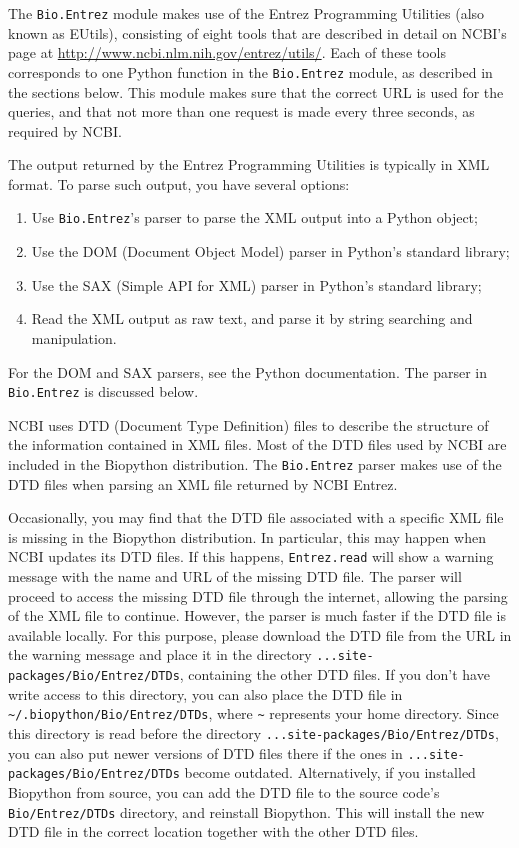 \documentclass{report}
\begin{document}
The \verb+Bio.Entrez+ module makes use of the Entrez Programming Utilities (also known as EUtils), consisting of eight tools that are described in detail on NCBI's page at \url{http://www.ncbi.nlm.nih.gov/entrez/utils/}.
Each of these tools corresponds to one Python function in the \verb+Bio.Entrez+ module, as described in the sections below. This module makes sure that the correct URL is used for the queries, and that not more than one request is made every three seconds, as required by NCBI.

The output returned by the Entrez Programming Utilities is typically in XML format. To parse such output, you have several options:
\begin{enumerate}
  \item Use \verb+Bio.Entrez+'s parser to parse the XML output into a Python object;
  \item Use the DOM (Document Object Model) parser in Python's standard library;
  \item Use the SAX (Simple API for XML) parser in Python's standard library;
  \item Read the XML output as raw text, and parse it by string searching and manipulation.
\end{enumerate}
For the DOM and SAX parsers, see the Python documentation. The parser in \verb+Bio.Entrez+ is discussed below.

NCBI uses DTD (Document Type Definition) files to describe the structure of the information contained in XML files. Most of the DTD files used by NCBI are included in the Biopython distribution. The \verb+Bio.Entrez+ parser makes use of the DTD files when parsing an XML file returned by NCBI Entrez.

Occasionally, you may find that the DTD file associated with a specific XML file is missing in the Biopython distribution. In particular, this may happen when NCBI updates its DTD files. If this happens, \verb+Entrez.read+ will show a warning message with the name and URL of the missing DTD file. The parser will proceed to access the missing DTD file through the internet, allowing the parsing of the XML file to continue.  However, the parser is much faster if the DTD file is available locally. For this purpose, please download the DTD file from the URL in the warning message and place it in the directory \verb+...site-packages/Bio/Entrez/DTDs+, containing the other DTD files.  If you don't have write access to this directory, you can also place the DTD file in \verb+~/.biopython/Bio/Entrez/DTDs+, where \verb+~+ represents your home directory. Since this directory is read before the directory \verb+...site-packages/Bio/Entrez/DTDs+, you can also put newer versions of DTD files there if the ones in \verb+...site-packages/Bio/Entrez/DTDs+ become outdated. Alternatively, if you installed Biopython from source, you can add the DTD file to the source code's \verb+Bio/Entrez/DTDs+ directory, and reinstall Biopython. This will install the new DTD file in the correct location together with the other DTD files.
\end{document}
